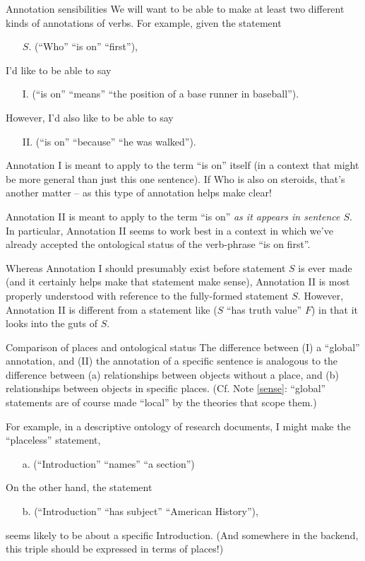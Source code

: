 \begin{notate}{Annotation sensibilities}\label{sense}
We will want to be able to make at least two different
kinds of annotations of verbs.  For example, given the
statement
\begin{itemize}
\item[$S$.] (``Who'' ``is on'' ``first''),
\end{itemize}
I'd like to be able to say
\begin{itemize}
\item[I.](``is on'' ``means'' ``the position of a base runner in baseball'').
\end{itemize}
However, I'd also like to be able to say
\begin{itemize}
\item[II.] (``is on'' ``because'' ``he was walked'').
\end{itemize}
Annotation I is meant to apply to the term ``is on''
itself (in a context that might be more general than just
this one sentence).  If Who is also on steroids, that's
another matter -- as this type of annotation helps make
clear!

Annotation II is meant to apply to the term ``is on''
\emph{as it
  appears in sentence $S$}.  In particular, Annotation II
seems to work best in a context in which we've already
accepted the ontological status of the verb-phrase ``is
on first''.

Whereas Annotation I should presumably exist before
statement $S$ is ever made (and it certainly helps make
that statement make sense), Annotation II is most properly
understood with reference to the fully-formed statement
$S$.  However, Annotation II is different from a statement
like ($S$ ``has truth value'' $F$) in that it looks into
the guts of $S$.
\end{notate}

\begin{notate}{Comparison of places and ontological status} \label{places-and-onto-status}
The difference between (I) a ``global'' annotation, and
(II) the annotation of a specific sentence is analogous to
the difference between (a) relationships between objects
without a place, and (b) relationships between objects in
specific places.  (Cf. Note \ref{sense}: ``global''
statements are of course made ``local'' by the theories
that scope them.)

For example, in a descriptive ontology of research
documents, I might make the ``placeless'' statement,
\begin{itemize}
\item[a.] (``Introduction'' ``names'' ``a section'')
\end{itemize}
On the other hand, the statement
\begin{itemize}
\item[b.] (``Introduction'' ``has subject'' ``American
  History''),
\end{itemize}
seems likely to be about a specific Introduction.  (And
somewhere in the backend, this triple should be expressed
in terms of places!)
\end{notate}

